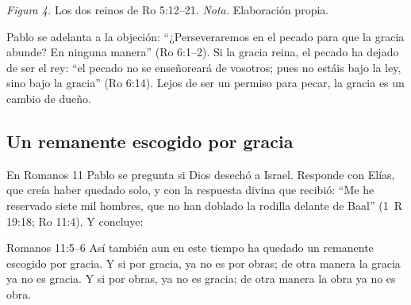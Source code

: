 \begin{center}
\par
{\footnotesize\color{gris}\textit{Figura 4.} Los dos reinos de Ro 5:12--21. \textit{Nota.} Elaboración propia.}
\end{center}

Pablo se adelanta a la objeción: ``¿Perseveraremos en el pecado para que la gracia abunde? En ninguna manera'' (Ro 6:1--2). Si la gracia reina, el pecado ha dejado de ser el rey: ``el pecado no se enseñoreará de vosotros; pues no estáis bajo la ley, sino bajo la gracia'' (Ro 6:14). Lejos de ser un permiso para pecar, la gracia es un cambio de dueño.

\subsection{Un remanente escogido por gracia}
En Romanos 11 Pablo se pregunta si Dios desechó a Israel. Responde con Elías, que creía haber quedado solo, y con la respuesta divina que recibió: ``Me he reservado siete mil hombres, que no han doblado la rodilla delante de Baal'' (1~R 19:18; Ro 11:4). Y concluye:

\begin{verso}{Romanos 11:5–6}
Así también aun en este tiempo ha quedado un remanente escogido por gracia. Y si por gracia, ya no es por obras; de otra manera la gracia ya no es gracia. Y si por obras, ya no es gracia; de otra manera la obra ya no es obra.
\end{verso}

